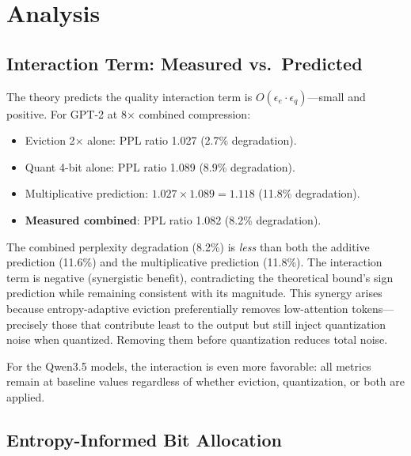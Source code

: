\documentclass[11pt]{article}
\begin{document}
\section{Analysis}
\label{sec:analysis}

\subsection{Interaction Term: Measured vs.\ Predicted}
\label{sec:interaction_analysis}

The theory predicts the quality interaction term is $O(\epsilon_e \cdot \epsilon_q)$---small and positive.  For GPT-2 at 8$\times$ combined compression:
\begin{itemize}[leftmargin=*]
    \item Eviction 2$\times$ alone: PPL ratio 1.027 (2.7\% degradation).
    \item Quant 4-bit alone: PPL ratio 1.089 (8.9\% degradation).
    \item Multiplicative prediction: $1.027 \times 1.089 = 1.118$ (11.8\% degradation).
    \item \textbf{Measured combined}: PPL ratio 1.082 (8.2\% degradation).
\end{itemize}

The combined perplexity degradation (8.2\%) is \emph{less} than both the additive prediction (11.6\%) and the multiplicative prediction (11.8\%).  The interaction term is negative (synergistic benefit), contradicting the theoretical bound's sign prediction while remaining consistent with its magnitude.  This synergy arises because entropy-adaptive eviction preferentially removes low-attention tokens---precisely those that contribute least to the output but still inject quantization noise when quantized.  Removing them before quantization reduces total noise.

For the Qwen3.5 models, the interaction is even more favorable: all metrics remain at baseline values regardless of whether eviction, quantization, or both are applied.

\subsection{Entropy-Informed Bit Allocation}
\label{sec:entropy_bits}
\end{document}
